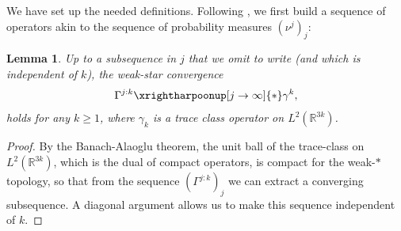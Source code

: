 \documentclass[11pt,a4paper]{article}
\theoremstyle{definition}
\theoremstyle{plain}
\newtheorem{lemma}[defi]{Lemma}
\begin{document}
We have set up the needed definitions. Following \cite{Rougerie2020}, we first build a sequence of operators akin to the sequence of probability measures $(\nu^j)_j$:
\begin{lemma}
    \label{lem:gammak}
    Up to a subsequence in $j$ that we omit to write (and which is independent of $k$), the weak-star convergence
    $$\Gamma^{j:k}\xrightharpoonup[j\rightarrow \infty]{*} \gamma^k,$$
    holds for any $k\geq 1$, where $\gamma_k$ is a trace class operator on $L^2(\mathbb{R}^{3k})$.
\end{lemma}
\begin{proof}
    By the Banach-Alaoglu theorem, the unit ball of the trace-class on $L^2(\mathbb{R}^{3k})$, which is the dual of compact operators, is compact for the weak-$*$ topology, so that from the sequence $(\Gamma^{j:k})_j$ we can extract a converging subsequence. A diagonal argument allows us to make this sequence independent of $k$.
\end{proof}
\end{document}
